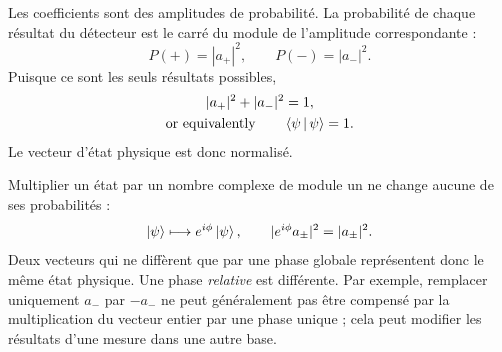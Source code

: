 Les coefficients sont des amplitudes de probabilité. La probabilité de chaque résultat du détecteur est le carré du module de l’amplitude correspondante :
\begin{equation}
  P(+)=|a_+|^2,
  \qquad
  P(-)=|a_-|^2.
  \label{eq:l02-born-rule}
\end{equation}
Puisque ce sont les seuls résultats possibles,
\begin{equation}
  \begin{gathered}
    |a_+|^2+|a_-|^2=1,\\
    \text{or equivalently}\qquad \left\langle\psi\,\middle|\,\psi\right\rangle=1.
  \end{gathered}
  \label{eq:l02-normalization}
\end{equation}
Le vecteur d’état physique est donc normalisé.

\begin{classroomqa}
\end{classroomqa}

Multiplier un état par un nombre complexe de module un ne change aucune de ses probabilités :
\begin{equation}
  \left\lvert\psi\right\rangle\longmapsto e^{i\phi}\left\lvert\psi\right\rangle,
  \qquad
  |e^{i\phi}a_\pm|^2=|a_\pm|^2.
  \label{eq:l02-global-phase}
\end{equation}
Deux vecteurs qui ne diffèrent que par une phase globale représentent donc le même état physique. Une phase \emph{relative} est différente. Par exemple, remplacer uniquement \(a_-\) par \(-a_-\) ne peut généralement pas être compensé par la multiplication du vecteur entier par une phase unique ; cela peut modifier les résultats d’une mesure dans une autre base.

\begin{classroomqa}
\end{classroomqa}


